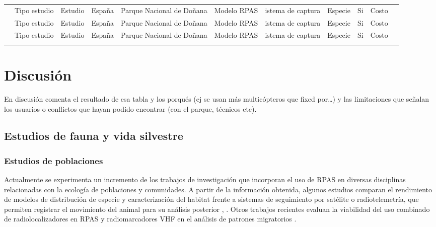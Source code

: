 \documentclass[11pt,]{article}
\begin{document}
\begin{sidewaystable}
\begin{tabular}{p{2.5cm}p{1cm}p{3cm}p{1cm}p{2cm}p{2cm}p{1cm}p{2cm}p{2cm}p{1cm}p{0.5cm}}
\cite{Frederick2009}  & Tipo estudio & Estudio & España & Parque Nacional de Doñana & Modelo RPAS & istema de captura & Especie & Si & Costo  \\ 
\cite{PazmanyMulero2015}  & Tipo estudio & Estudio & España & Parque Nacional de Doñana & Modelo RPAS  & istema de captura & Especie & Si & Costo  \\ 
\cite{PazmanyMulero2015}  & Tipo estudio & Estudio & España & Parque Nacional de Doñana & Modelo RPAS  & istema de captura & Especie & Si & Costo  \\ \\ \cmidrule(r){1-11}
\end{tabular}
\end{sidewaystable}

\section{Discusión}\label{discusion}

En discusión comenta el resultado de esa tabla y los porqués (ej se usan
más multicópteros que fixed por\ldots{}) y las limitaciones que señalan
los usuarios o conflictos que hayan podido encontrar (con el parque,
técnicos etc).

\subsection{Estudios de fauna y vida
silvestre}\label{estudios-de-fauna-y-vida-silvestre}

\subsubsection{Estudios de poblaciones}\label{estudios-de-poblaciones}

Actualmente se experimenta un incremento de los trabajos de
investigación que incorporan el uso de RPAS en diversas disciplinas
relacionadas con la ecología de poblaciones y comunidades. A partir de
la información obtenida, algunos estudios comparan el rendimiento de
modelos de distribución de especie y caracterización del habitat frente
a sistemas de seguimiento por satélite o radiotelemetría, que permiten
registrar el movimiento del animal para su análisis posterior
\citep{PazmanyMulero2015}, \citep{Mulero-Pazmany2015}. Otros trabajos
recientes evaluan la viabilidad del uso combinado de radiolocalizadores
en RPAS y radiomarcadores VHF en el análisis de patrones migratorios
\citep{Bayram2016}.
\end{document}
